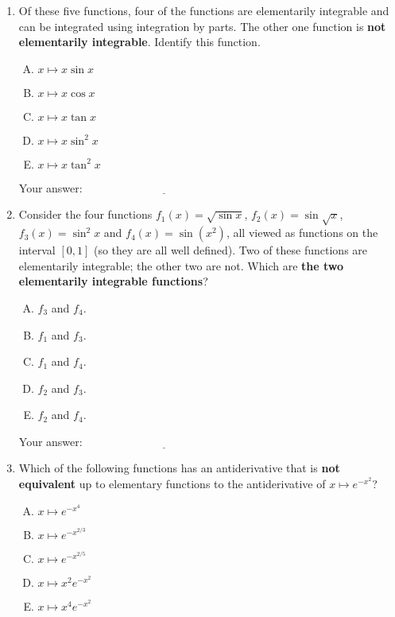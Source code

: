 \documentclass[10pt]{amsart}
\begin{document}
\begin{enumerate}
  
\item Of these five functions, four of the functions are elementarily
  integrable and can be integrated using integration by parts. The
  other one function is {\bf not elementarily integrable}. Identify
  this function.

  \begin{enumerate}[(A)]
  \item $x \mapsto x \sin x$
  \item $x \mapsto x \cos x$
  \item $x \mapsto x \tan x$
  \item $x \mapsto x \sin^2x$
  \item $x \mapsto x \tan^2x$
  \end{enumerate}

  \vspace{0.05in}
  Your answer: $\underline{\qquad\qquad\qquad\qquad\qquad\qquad\qquad}$
  \vspace{0.05in}

\item Consider the four functions $f_1(x) = \sqrt{\sin x}$, $f_2(x) =
  \sin \sqrt{x}$, $f_3(x) = \sin^2 x$ and $f_4(x) = \sin(x^2)$, all
  viewed as functions on the interval $[0,1]$ (so they are all well
  defined). Two of these functions are elementarily integrable; the
  other two are not. Which are {\bf the two elementarily integrable
  functions}?

  \begin{enumerate}[(A)]
  \item $f_3$ and $f_4$.
  \item $f_1$ and $f_3$.
  \item $f_1$ and $f_4$. 
  \item $f_2$ and $f_3$.
  \item $f_2$ and $f_4$.
  \end{enumerate}

  \vspace{0.05in}
  Your answer: $\underline{\qquad\qquad\qquad\qquad\qquad\qquad\qquad}$
  \vspace{0.05in}

\item Which of the following functions has an antiderivative that is
  {\bf not equivalent} up to elementary functions to the antiderivative of
  $x \mapsto e^{-x^2}$?

  \begin{enumerate}[(A)]
  \item $x \mapsto e^{-x^4}$
  \item $x \mapsto e^{-x^{2/3}}$
  \item $x \mapsto e^{-x^{2/5}}$
  \item $x \mapsto x^2e^{-x^2}$
  \item $x \mapsto x^4e^{-x^2}$
  \end{enumerate}


\end{enumerate}
\end{document}
